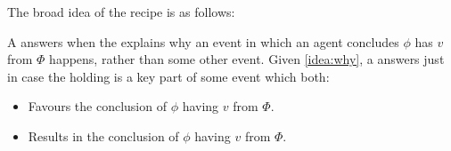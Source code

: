 \begin{note}
  The broad idea of the recipe is as follows:

  A \ros{} answers \qWhy{} when the \ros{} explains why an event in which an agent concludes \(\phi\) has  \(v\) from \(\Phi\) happens, rather than some other event.
  Given \autoref{idea:why}, a \ros{} answers \qWhy{} just in case the \ros{} holding is a key part of some event which both:
  \begin{itemize}
  \item
    Favours the \agents{} conclusion of \(\phi\) having  \(v\) from \(\Phi\).
  \item
    Results in the \agents{} conclusion of \(\phi\) having  \(v\) from \(\Phi\).
  \end{itemize}
\end{note}


